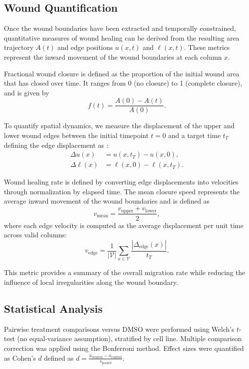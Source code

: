 \subsection{Wound Quantification}

Once the wound boundaries have been extracted and temporally constrained, quantitative measures of wound healing can be derived from the resulting area trajectory $A(t)$ and edge positions $u(x,t)$ and $\ell(x,t)$. These metrics represent the inward movement of the wound boundaries at each column $x$. 

Fractional wound closure is defined as the proportion of the initial wound area that has closed over time. It ranges from 0 (no closure) to 1 (complete closure), and is given by
\begin{equation}
	f(t) = \frac{A(0) - A(t)}{A(0)}.
\end{equation}


To quantify spatial dynamics, we measure the displacement of the upper and lower wound edges between the initial timepoint $t = 0$ and a target time $t_T$ defining the edge displacement as :
\begin{align}
	\Delta u(x) &= u(x, t_T) - u(x, 0), \\
	\Delta \ell(x) &= \ell(x, 0) - \ell(x, t_T).
\end{align}


Wound healing rate is defined by converting edge displacements into velocities through normalization by elapsed time. The mean closure speed represents the average inward movement of the wound boundaries and is defined as
\begin{equation}
	v_\text{mean} = \frac{v_\text{upper} + v_\text{lower}}{2},
\end{equation}
where each edge velocity is computed as the average displacement per unit time across valid columns:
\begin{equation}
	v_\text{edge} = \frac{1}{|\mathcal{V}|} \sum_{x \in \mathcal{V}} \frac{|\Delta_\text{edge}(x)|}{t_T}.
\end{equation}

This metric provides a summary of the overall migration rate while reducing the influence of local irregularities along the wound boundary.


\subsection{Statistical Analysis}

Pairwise treatment comparisons versus DMSO were performed using Welch's $t$-test
(no equal-variance assumption), stratified by cell line.
Multiple comparison correction was applied using the Bonferroni method.
Effect sizes were quantified as Cohen's $d$ defined as  $d = \frac{\bar{x}_\text{treated} - \bar{x}_\text{control}}{s_\text{pooled}}$.

